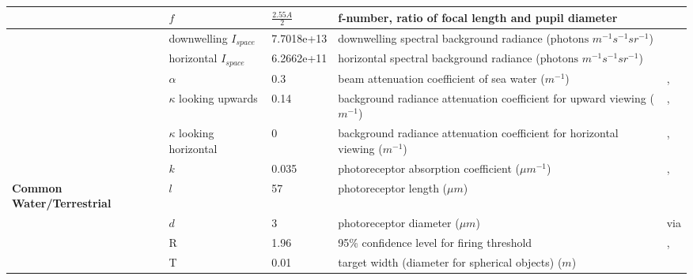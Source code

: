 \begin{tabular}{|L{3.5cm}|L{2.5cm}|L{2.5cm}|L{4.5cm}|L{4.5cm}|}
 &$f$&$\frac{2.55A}{2}$&f-number, ratio of focal length and pupil diameter&\cite{Nils14a}\\\hline
 &downwelling $I_{space}$&7.7018e+13&downwelling spectral background radiance ($\text{photons } m^{-1} s^{-1} sr^{-1}$)&\cite{Nils14a}\\\hline
 &horizontal $I_{space}$&6.2662e+11&horizontal spectral background radiance ($\text{photons } m^{-1} s^{-1} sr^{-1}$)&\cite{Nils14a}\\\hline
 &$\alpha$&0.3&beam attenuation coefficient of sea water ($m^{-1}$)&\cite{Nils14a},\cite{John02a}\\\hline
 &$\kappa$ looking upwards&0.14&background radiance attenuation coefficient for upward viewing ($m^{-1}$)&\cite{Nils14a},\cite{John02a}\\\hline
 &$\kappa$ looking horizontal&0&background radiance attenuation coefficient for horizontal viewing ($m^{-1}$)&\cite{Nils14a},\cite{John02a}\\\hline
 &$k$&0.035&photoreceptor absorption coefficient ($\mu m^{-1}$)&\cite{Warr98a}, \cite{Part90a}\\\hline
\textbf{Common Water/Terrestrial}&$l$&57&photoreceptor length ($\mu m$)&\cite{Nils14a}\\\hline
 &$d$&3&photoreceptor diameter ($\mu m$)&\cite{Nils14a} via \cite{Land12a}\\\hline
 &R&1.96&95\% confidence level for firing threshold&\cite{Nils14a},\cite{Land81a}\\\hline
 &T&0.01&target width (diameter for spherical objects) ($m$)& \\\hline
\end{tabular}
